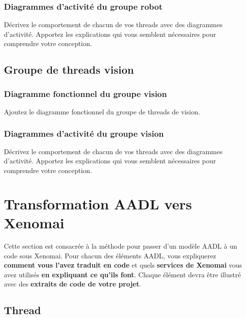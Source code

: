 \documentclass[11pt, a4paper]{paper}
\begin{document}
\subsubsection{Diagrammes d'activité du groupe robot}
{\color{blue}Décrivez le comportement de chacun de vos threads avec des diagrammes d'activité. Apportez les explications qui vous semblent nécessaires pour comprendre votre conception.}



\subsection{Groupe de threads vision}

\subsubsection{Diagramme fonctionnel du groupe vision}

{\color{blue} Ajoutez le diagramme fonctionnel du groupe de threads de vision.}


\subsubsection{Diagrammes d'activité du groupe vision}
{\color{blue}Décrivez le comportement de chacun de vos threads avec des diagrammes d'activité. Apportez les explications qui vous semblent nécessaires pour comprendre votre conception.}



\section{Transformation AADL vers Xenomai}
 
 {\color{red} Cette section est consacrée à la méthode pour passer d'un modèle AADL à un code sous Xenomai. Pour chacun des éléments AADL, vous expliquerez {\bf comment vous l'avez traduit en code} et quels {\bf services de Xenomai} vous avez utilisés {\bf en expliquant ce qu'ils font}. Chaque élément devra être illustré avec des {\bf extraits de code de votre projet}.}
 
\subsection{Thread}
\end{document}
